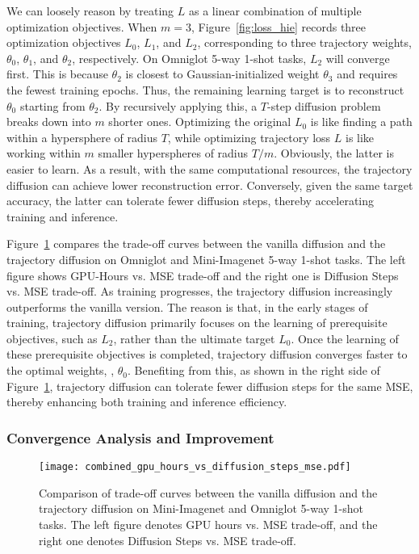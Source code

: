 We can loosely reason by treating $L$ as a linear combination of multiple optimization objectives. When $m=3$, Figure~\ref{fig:loss_hie} records three optimization objectives $L_0$, $L_1$, and $L_2$, corresponding to three trajectory weights, $\theta_0$, $\theta_1$, and $\theta_2$, respectively. On Omniglot 5-way 1-shot tasks, $L_2$ will converge first. This is because $\theta_{2}$ is closest to Gaussian-initialized weight ${\theta_3}$ and requires the fewest training epochs. Thus, the remaining learning target is to reconstruct ${\theta_0}$ starting from $\theta_2$. By recursively applying this, a $T$-step diffusion problem breaks down into $m$ shorter ones. Optimizing the original $L_0$ is like finding a path within a hypersphere of radius $T$, while optimizing trajectory loss $L$ is like working within $m$ smaller hyperspheres of radius $T/m$. Obviously, the latter is easier to learn. As a result, with the same computational resources, the trajectory diffusion can achieve lower reconstruction error. Conversely, given the same target accuracy, the latter can tolerate fewer diffusion steps, thereby accelerating training and inference.

Figure~\ref{fig:trade-off} compares the trade-off curves between the vanilla diffusion and the trajectory diffusion on Omniglot and Mini-Imagenet 5-way 1-shot tasks. The left figure shows GPU-Hours vs. MSE trade-off and the right one is Diffusion Steps vs. MSE trade-off. As training progresses, the trajectory diffusion increasingly outperforms the vanilla version. The reason is that, in the early stages of training, trajectory diffusion primarily focuses on the learning of prerequisite objectives, such as $L_2$, rather than the ultimate target $L_0$. Once the learning of these prerequisite objectives is completed, trajectory diffusion converges faster to the optimal weights, \ie, $\theta_0$. Benefiting from this, as shown in the right side of Figure~\ref{fig:trade-off}, trajectory diffusion can tolerate fewer diffusion steps for the same MSE, thereby enhancing both training and inference efficiency. 


\subsubsection{Convergence Analysis and Improvement}\label{sec:SAM}

\begin{figure}[t]
    \centering
    \texttt{[image: combined\_gpu\_hours\_vs\_diffusion\_steps\_mse.pdf]}
    \caption{Comparison of trade-off curves between the vanilla diffusion and the trajectory diffusion on Mini-Imagenet and Omniglot 5-way 1-shot tasks. The left figure denotes GPU hours vs. MSE trade-off, and the right one denotes Diffusion Steps vs. MSE trade-off.}
    \label{fig:trade-off}
\end{figure}

